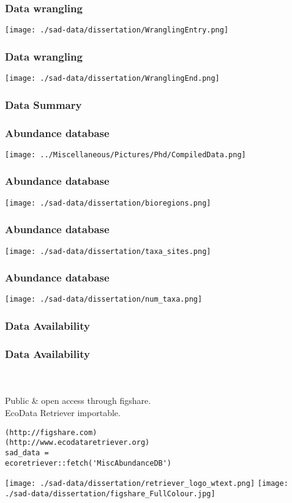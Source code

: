 \documentclass[14pt]{beamer}
\begin{document}
\begin{frame}[t]
\frametitle{Data wrangling}
\begin{center}
\texttt{[image: ./sad-data/dissertation/WranglingEntry.png]}
\end{center}
\end{frame}

\begin{frame}[t]
\frametitle{Data wrangling}
\begin{center}
\texttt{[image: ./sad-data/dissertation/WranglingEnd.png]}
\end{center}
\end{frame}

\subsubsection{Data Summary}
\begin{frame}{}
\frametitle{Abundance database}
\texttt{[image: ../Miscellaneous/Pictures/Phd/CompiledData.png]}
\end{frame}

\begin{frame}{}
\frametitle{Abundance database}
\texttt{[image: ./sad-data/dissertation/bioregions.png]}
\end{frame}

\begin{frame}{}
\frametitle{Abundance database}
\texttt{[image: ./sad-data/dissertation/taxa\_sites.png]}
\end{frame}

\begin{frame}{}
\frametitle{Abundance database}
\texttt{[image: ./sad-data/dissertation/num\_taxa.png]}
\end{frame}

\subsubsection{Data Availability}
\begin{frame}[fragile]
\frametitle{Data Availability}
~\\
~\\
Public \& open access through figshare.\\
EcoData Retriever importable.\\
\begin{verbatim}
(http://figshare.com)
(http://www.ecodataretriever.org)
sad_data = 
ecoretriever::fetch('MiscAbundanceDB')
\end{verbatim}
\texttt{[image: ./sad-data/dissertation/retriever\_logo\_wtext.png]}
\texttt{[image: ./sad-data/dissertation/figshare\_FullColour.jpg]}
\end{frame}
\end{document}
